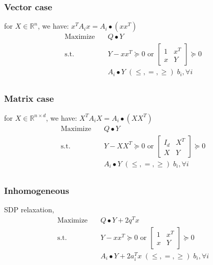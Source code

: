 \documentclass[../main]{subfiles}
\begin{document}
\subsubsection{Vector case}
for \(X \in \mathbb{R}^{n}\), we have: \(x^{T} A_{i} x = A_i \bullet (xx^T)\)
\begin{equation}
  \begin{aligned}
    \mathrm{Maximize}\quad & Q\bullet Y                                                        \\
    \mathrm{s.t.}  \quad   & Y-xx^T \succeq 0 \text { or } \begin{bmatrix} 1 & x^{T} \\ x & Y \end{bmatrix} \succeq 0 \\
                           & A_i \bullet Y \; (\le, =, \ge) \; b_i, \forall i                  \\
  \end{aligned}
\end{equation}

\subsubsection{Matrix case}
for \(X \in \mathbb{R}^{n\times d}\), we have: \(X^{T} A_{i} X = A_i \bullet (XX^T)\)
\begin{equation}
  \begin{aligned}
    \mathrm{Maximize}\quad & Q\bullet Y                                                       \\
    \mathrm{s.t.}  \quad   & Y-XX^T \succeq 0 \text { or }\begin{bmatrix} I_d & X^{T} \\ X & Y \end{bmatrix} \succeq 0 \\
                           & A_i \bullet Y \; (\le, =, \ge) \; b_i, \forall i                 \\
  \end{aligned}
\end{equation}

\subsubsection{Inhomogeneous}
SDP relaxation,
\begin{equation}
  \begin{aligned}
    \mathrm{Maximize}\quad & Q\bullet Y   + 2q^T x                                            \\
    \mathrm{s.t.}  \quad   & Y-xx^T \succeq 0 \text { or }\begin{bmatrix} 1 & x^{T} \\ x & Y \end{bmatrix} \succeq 0 \\
                           & A_i \bullet Y +2 a_i^Tx \; (\le, =, \ge) \; b_i, \forall i       \\
  \end{aligned}
\end{equation}
\end{document}
